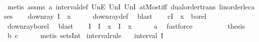 \begin{isabellebody}
\ \ \ \ \isamarkupfalse%
\ {\isacharparenleft}{\kern0pt}metis\ assms\ a\ interval{\isacharunderscore}{\kern0pt}def\ UnE\ UnI{}\ UnI{}\ atMost{\isacharunderscore}{\kern0pt}iff\ dual{\isacharunderscore}{\kern0pt}order{\isachardot}{\kern0pt}trans\ linorder{\isacharunderscore}{\kern0pt}le{\isacharunderscore}{\kern0pt}cases{\isacharparenright}{\kern0pt}\isanewline
\ \ \isamarkupfalse%
\ {\isachardoublequoteopen}down{\isacharunderscore}{\kern0pt}ray\ {\isacharparenleft}{\kern0pt}I\ {\isasymunion}\ {\isacharbraceleft}{\kern0pt}{\isachardot}{\kern0pt}{\isachardot}{\kern0pt}x{\isacharbraceright}{\kern0pt}{\isacharparenright}{\kern0pt}{\isachardoublequoteclose}\isanewline
\ \ \ \ \isamarkupfalse%
\ down{\isacharunderscore}{\kern0pt}ray{\isacharunderscore}{\kern0pt}def\ \isamarkupfalse%
\ blast\isanewline
\ \ \isamarkupfalse%
\ c{\isacharcolon}{\kern0pt}{\isachardoublequoteopen}I\ {\isasymunion}\ {\isacharbraceleft}{\kern0pt}{\isachardot}{\kern0pt}{\isachardot}{\kern0pt}x{\isacharbraceright}{\kern0pt}\ {\isasymin}\ borel{\isachardoublequoteclose}\isanewline
\ \ \ \ \isamarkupfalse%
\ down{\isacharunderscore}{\kern0pt}ray{\isacharunderscore}{\kern0pt}borel\ \isamarkupfalse%
\ blast\isanewline
\isanewline
\ \ \isamarkupfalse%
\ {\isachardoublequoteopen}I\ {\isacharequal}{\kern0pt}\ {\isacharparenleft}{\kern0pt}I\ {\isasymunion}\ {\isacharbraceleft}{\kern0pt}x{\isachardot}{\kern0pt}{\isachardot}{\kern0pt}{\isacharbraceright}{\kern0pt}{\isacharparenright}{\kern0pt}\ {\isasyminter}\ {\isacharparenleft}{\kern0pt}I\ {\isasymunion}\ {\isacharbraceleft}{\kern0pt}{\isachardot}{\kern0pt}{\isachardot}{\kern0pt}x{\isacharbraceright}{\kern0pt}{\isacharparenright}{\kern0pt}{\isachardoublequoteclose}\isanewline
\ \ \ \ \isamarkupfalse%
\ a\ \isamarkupfalse%
\ fastforce\ \ \ \ \isanewline
\isanewline
\ \ \isamarkupfalse%
\ \isamarkupfalse%
\ {\isacharquery}{\kern0pt}thesis\ \isamarkupfalse%
\ b\ c\isanewline
\ \ \ \ \isamarkupfalse%
\ {\isacharparenleft}{\kern0pt}metis\ sets{\isachardot}{\kern0pt}Int{\isacharparenright}{\kern0pt}\isanewline
{}\isamarkupfalse%
%
\endisatagproof
{\isafoldproof}%
%
\isadelimproof
\isanewline
%
\endisadelimproof
\isanewline
{}\isamarkupfalse%
\ interval{\isacharunderscore}{\kern0pt}rule{\isacharcolon}{\kern0pt}\isanewline
\ \ \ {\isachardoublequoteopen}interval\ I{\isachardoublequoteclose}\isanewline

\end{isabellebody}
